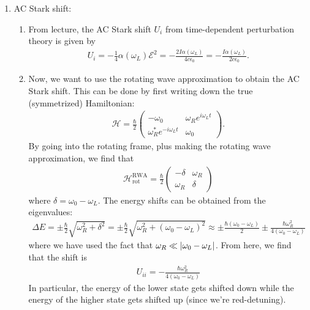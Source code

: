 \documentclass{article}
\theoremstyle{definition}
\newcommand{\ham}{\mathcal{H}}
\newcommand{\al}{\alpha}
\newcommand{\f}[2]{\frac{#1}{#2}}
\begin{document}
\begin{enumerate}[label=(\alph*)]
	\item AC Stark shift: 
	
	\begin{enumerate}[label=(\roman*)]
		\item From lecture, the AC Stark shift $U_i$ from time-dependent perturbation theory is given by 
		\begin{align*}
		U_i = -\f{1}{4}\al(\omega_L) \mathcal{E}^2 = -\f{2I\al(\omega_L)}{4c\epsilon_0} = -\f{I\al(\omega_L)}{2c\epsilon_0}.
		\end{align*}
		
		
		\item Now, we want to use the rotating wave approximation to obtain the AC Stark shift. This can be done by first writing down the true (symmetrized) Hamiltonian:
		\begin{align*}
		\ham = \f{\hbar}{2}\begin{pmatrix}
		-\omega_0 & \omega_R e^{i\omega_L t} \\ \omega_R^* e^{-i\omega_L t} & \omega_0
		\end{pmatrix}.
		\end{align*}
		By going into the rotating frame, plus making the rotating wave approximation, we find that
		\begin{align*}
		\ham_\text{rot}^\text{RWA} = \f{\hbar}{2}\begin{pmatrix}
		-\delta & \omega_R \\ \omega_R & \delta
		\end{pmatrix}
		\end{align*}
		where $\delta = \omega_0 - \omega_L$. The energy shifts can be obtained from the eigenvalues:
		\begin{align*}
		\Delta E = \pm  \f{\hbar}{2}\sqrt{\omega_R^2 + \delta^2} =\pm \f{\hbar}{2}\sqrt{\omega_R^2 + (\omega_0 - \omega_L)^2} \approx \pm \f{\hbar(\omega_0 - \omega_L)}{2} \pm \f{\hbar \omega_R^2}{4(\omega_0 - \omega_L)}
		\end{align*}
		where we have used the fact that $\omega_R \ll \abs{\omega_0 - \omega_L}$. From here, we find that the shift is 
		\begin{align*}
		U_{ii} = -\f{\hbar \omega_R^2}{4(\omega_0 - \omega_L)} 
		\end{align*}
		In particular, the energy of the lower state gets shifted down while the energy of the higher state gets shifted up (since we're red-detuning). 
		

\end{enumerate}
\end{enumerate}
\end{document}
